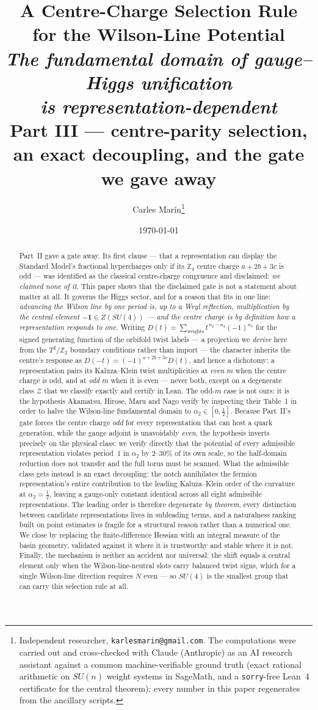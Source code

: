 \documentclass[11pt,a4paper]{article}
\title{\textbf{\Large A Centre-Charge Selection Rule\\ for the Wilson-Line Potential}\\[7pt]
\large\textnormal{\itshape The fundamental domain of gauge--Higgs unification\\
is representation-dependent}\\[8pt]
\normalsize\textnormal{Part III --- centre-parity selection, an exact decoupling,
and the gate we gave away}}
\author{Carles Mar\'in\thanks{Independent researcher, \texttt{karlesmarin@gmail.com}.
The computations were carried out and cross-checked with Claude (Anthropic) as an AI
research assistant against a common machine-verifiable ground truth (exact rational
arithmetic on $SU(n)$ weight systems in SageMath, and a \texttt{sorry}-free Lean~4
certificate for the central theorem); every number in this paper regenerates from the
ancillary scripts.}}
\date{\today}
\newcommand{\ZZ}{\mathbb{Z}}
\begin{document}
\maketitle

\begin{abstract}
\noindent
Part~II gave a gate away. Its first clause --- that a representation can display the
Standard Model's fractional hypercharges only if its $\ZZ_4$ centre charge $a+2b+3c$ is
odd --- was identified as the classical centre-charge congruence and disclaimed: \emph{we
claimed none of it}. This paper shows that the disclaimed gate is not a statement about
matter at all. It governs the Higgs sector, and for a reason that fits in one line:
\emph{advancing the Wilson line by one period is, up to a Weyl reflection, multiplication by
the central element $-\mathbf{1}\in Z(SU(4))$ --- and the centre charge is by definition how
a representation responds to one.} Writing $D(t)=\sum_{\text{weights}}
t^{\,n_2-n_4}(-1)^{n_3}$ for the signed generating function of the orbifold twist labels
--- a projection we \emph{derive} here from the $T^2/\ZZ_2$ boundary conditions rather than
import --- the character inherits the centre's response as
$D(-t)=(-1)^{a+2b+3c}D(t)$, and hence a dichotomy: a representation pairs its Kaluza--Klein
twist multiplicities at \emph{even} $m$ when the centre charge is odd, and at \emph{odd}
$m$ when it is even --- never both, except on a degenerate class $\mathcal Z$ that we
classify exactly and certify in Lean. The odd-$m$ case is not ours: it is the hypothesis
Akamatsu, Hirose, Maru and Nago verify by inspecting their Table~1 in order to halve the
Wilson-line fundamental domain to $\alpha_2\in[0,\tfrac12]$. Because Part~II's gate forces
the centre charge \emph{odd} for every representation that can host a quark generation,
while the gauge adjoint is unavoidably \emph{even}, the hypothesis inverts precisely on the
physical class: we verify directly that the potential of every admissible representation
violates period~$1$ in $\alpha_2$ by $2$--$30\%$ of its own scale, so the half-domain
reduction does not transfer and the full torus must be scanned. What the admissible class
gets instead is an exact decoupling: the notch annihilates the fermion representation's
entire contribution to the leading Kaluza--Klein order of the curvature at
$\alpha_2=\tfrac12$, leaving a gauge-only constant identical across all eight admissible
representations. The leading order is therefore degenerate \emph{by theorem}, every
distinction between candidate representations lives in subleading terms, and a naturalness
ranking built on point estimates is fragile for a structural reason rather than a numerical
one. We close by replacing the finite-difference Hessian with an integral measure of the
basin geometry, validated against it where it is trustworthy and stable where it is not.
Finally, the mechanism is neither an accident nor universal: the shift equals a central
element only when the Wilson-line-neutral slots carry balanced twist signs, which for a
single Wilson-line direction requires $N$ even --- so $SU(4)$ is the smallest group that can
carry this selection rule at all.
\end{abstract}
\end{document}
